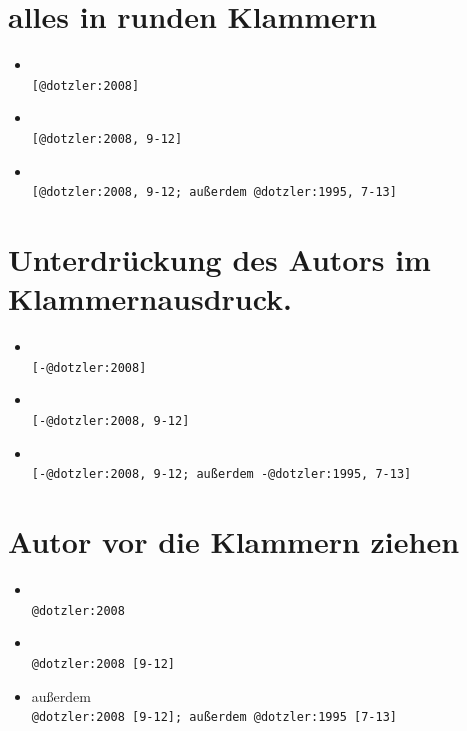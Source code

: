 \documentclass[ngerman,a4,footexclude,headinclude,DIV=9]{scrartcl}
\begin{document}
\section{alles in runden Klammern}\label{alles-in-runden-klammern}

\begin{itemize}
\itemsep1pt\parskip0pt
\item
  \autocite{dotzler:2008}\\ \texttt{{[}@dotzler:2008{]}}
\item
  \autocite[9-12]{dotzler:2008}\\ \texttt{{[}@dotzler:2008, 9-12{]}}
\item
  \autocites[9-12]{dotzler:2008}[außerdem][7-13]{dotzler:1995}\\
  \texttt{{[}@dotzler:2008, 9-12; außerdem @dotzler:1995, 7-13{]}}
\end{itemize}

\section{Unterdrückung des Autors im
Klammernausdruck.}\label{unterdruxfcckung-des-autors-im-klammernausdruck.}

\begin{itemize}
\itemsep1pt\parskip0pt
\item
  \autocite*{dotzler:2008}\\ \texttt{{[}-@dotzler:2008{]}}
\item
  \autocite*[9-12]{dotzler:2008}\\ \texttt{{[}-@dotzler:2008, 9-12{]}}
\item
  \autocites[9-12]{dotzler:2008}[außerdem][7-13]{dotzler:1995}\\
  \texttt{{[}-@dotzler:2008, 9-12; außerdem -@dotzler:1995, 7-13{]}}
\end{itemize}

\section{Autor vor die Klammern
ziehen}\label{autor-vor-die-klammern-ziehen}

\begin{itemize}
\itemsep1pt\parskip0pt
\item
  \textcite{dotzler:2008}\\ \texttt{@dotzler:2008}
\item
  \textcite[9-12]{dotzler:2008}\\ \texttt{@dotzler:2008 {[}9-12{]}}
\item
  \textcite[9-12]{dotzler:2008} außerdem \textcite[7-13]{dotzler:1995}\\
  \texttt{@dotzler:2008 {[}9-12{]}; außerdem @dotzler:1995 {[}7-13{]}}
\end{itemize}
\end{document}
